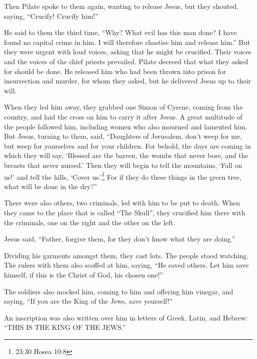  Then Pilate spoke to them again, wanting to release Jesus,
 but they shouted, saying, ``Crucify! Crucify him!''

 He said to them the third time, ``Why? What evil has this
man done? I have found no capital crime in him. I will therefore
chastise him and release him.''  But they were urgent with
loud voices, asking that he might be crucified. Their voices and the
voices of the chief priests prevailed.  Pilate decreed that
what they asked for should be done.  He released him who
had been thrown into prison for insurrection and murder, for whom they
asked, but he delivered Jesus up to their will.

 When they led him away, they grabbed one Simon of Cyrene,
coming from the country, and laid the cross on him to carry it after
Jesus.  A great multitude of the people followed him,
including women who also mourned and lamented him.  But
Jesus, turning to them, said, ``Daughters of Jerusalem, don't weep for
me, but weep for yourselves and for your children.  For
behold, the days are coming in which they will say, `Blessed are the
barren, the wombs that never bore, and the breasts that never nursed.'
 Then they will begin to tell the mountains, `Fall on us!'
and tell the hills, `Cover us.'\footnote{23:30 Hosea 10:8} 
For if they do these things in the green tree, what will be done in the
dry?''

 There were also others, two criminals, led with him to be
put to death.  When they came to the place that is called
``The Skull'', they crucified him there with the criminals, one on the
right and the other on the left.

 Jesus said, ``Father, forgive them, for they don't know
what they are doing.''

Dividing his garments amongst them, they cast lots.  The
people stood watching. The rulers with them also scoffed at him, saying,
``He saved others. Let him save himself, if this is the Christ of God,
his chosen one!''

 The soldiers also mocked him, coming to him and offering
him vinegar,  and saying, ``If you are the King of the
Jews, save yourself!''

 An inscription was also written over him in letters of
Greek, Latin, and Hebrew: ``THIS IS THE KING OF THE JEWS.''

